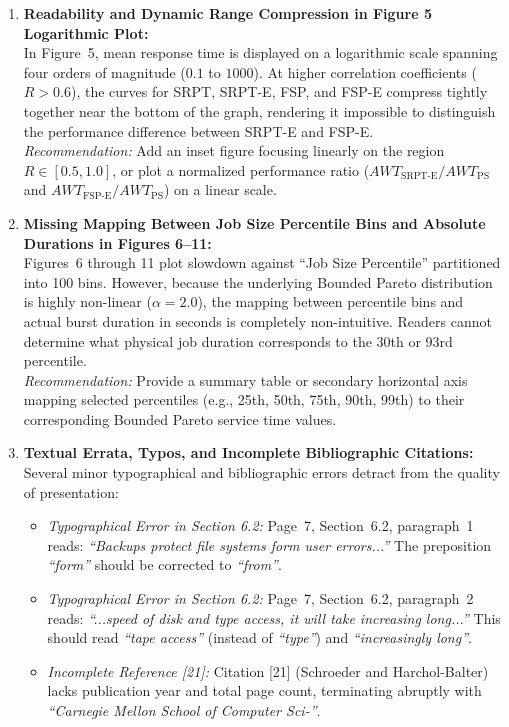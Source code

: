 \documentclass[11pt]{article}
\begin{document}
\begin{enumerate}[label=\textbf{Comment \arabic*:}, leftmargin=1.5em, itemsep=0.4em, parsep=0pt]

    \item \textbf{Readability and Dynamic Range Compression in Figure 5 Logarithmic Plot:} \\
    In Figure~5, mean response time is displayed on a logarithmic scale spanning four orders of magnitude ($0.1$ to $1000$). At higher correlation coefficients ($R > 0.6$), the curves for SRPT, SRPT-E, FSP, and FSP-E compress tightly together near the bottom of the graph, rendering it impossible to distinguish the performance difference between SRPT-E and FSP-E. \\
    \textit{Recommendation:} Add an inset figure focusing linearly on the region $R \in [0.5, 1.0]$, or plot a normalized performance ratio ($AWT_{\text{SRPT-E}} / AWT_{\text{PS}}$ and $AWT_{\text{FSP-E}} / AWT_{\text{PS}}$) on a linear scale.

    \item \textbf{Missing Mapping Between Job Size Percentile Bins and Absolute Durations in Figures 6--11:} \\
    Figures~6 through 11 plot slowdown against ``Job Size Percentile'' partitioned into 100 bins. However, because the underlying Bounded Pareto distribution is highly non-linear ($\alpha = 2.0$), the mapping between percentile bins and actual burst duration in seconds is completely non-intuitive. Readers cannot determine what physical job duration corresponds to the 30th or 93rd percentile. \\
    \textit{Recommendation:} Provide a summary table or secondary horizontal axis mapping selected percentiles (e.g., 25th, 50th, 75th, 90th, 99th) to their corresponding Bounded Pareto service time values.

    \item \textbf{Textual Errata, Typos, and Incomplete Bibliographic Citations:} \\
    Several minor typographical and bibliographic errors detract from the quality of presentation:
    \begin{itemize}[label=$\circ$, leftmargin=1.2em, itemsep=0.15em]
        \item \textit{Typographical Error in Section 6.2:} Page~7, Section~6.2, paragraph~1 reads: \textit{``Backups protect file systems form user errors...''} The preposition \textit{``form''} should be corrected to \textit{``from''}.
        \item \textit{Typographical Error in Section 6.2:} Page~7, Section~6.2, paragraph~2 reads: \textit{``...speed of disk and type access, it will take increasing long...''} This should read \textit{``tape access''} (instead of \textit{``type''}) and \textit{``increasingly long''}.
        \item \textit{Incomplete Reference [21]:} Citation [21] (Schroeder and Harchol-Balter) lacks publication year and total page count, terminating abruptly with \textit{``Carnegie Mellon School of Computer Sci-''}.
    \end{itemize}

\end{enumerate}
\end{document}
